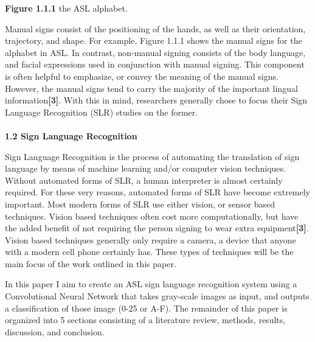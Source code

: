\documentclass[11pt]{article}
\begin{document}
\begin{multicols}{2}
\begin{center}
\textbf{Figure 1.1.1} the ASL alphabet.
\end{center}
\par
Manual signs consist of the positioning of the hands, as well as their orientation, trajectory, and shape.  For example, Figure 1.1.1 shows the manual signs for the alphabet in ASL.  In contrast, non-manual signing consists of the body language, and facial expressions used in conjunction with manual signing.  This component is often helpful to emphasize, or convey the meaning of the manual signs.  However, the manual signs tend to carry the majority of the important lingual information\textbf{[3]}.  With this in mind, researchers generally chose to focus their Sign Language Recognition (SLR) studies on the former. \\ \\
\textbf{1.2 Sign Language Recognition}

\par
Sign Language Recognition is the process of automating the translation of sign language by means of machine learning and/or computer vision techniques.  Without automated forms of SLR, a human interpreter is almost certainly required.  For these very reasons, automated forms of SLR have become extremely important.  Most modern forms of SLR use either vision, or sensor based techniques.  Vision based techniques often cost more computationally, but have the added benefit of not requiring the person signing to wear extra equipment\textbf{[3]}.  Vision based techniques generally only require a camera, a device that anyone with a modern cell phone certainly has.  These types of techniques will be the main focus of the work outlined in this paper.
\par
In this paper I aim to create an ASL sign language recognition system using a Convolutional Neural Network that takes gray-scale images as input, and outputs a classification of those image (0-25 or A-F).  The remainder of this paper is organized into 5 sections consisting of a literature review, methods, results, discussion, and conclusion.


\end{multicols}
\end{document}

